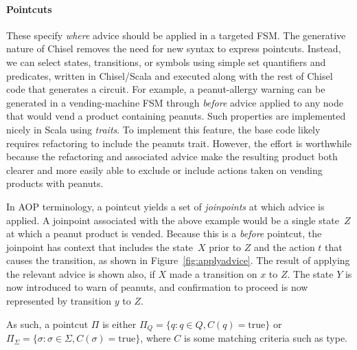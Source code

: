 \documentclass[sigplan,anonymous,review]{acmart}
\begin{document}
\paragraph{Pointcuts} These specify \emph{where} advice should be applied in a targeted FSM.   The generative nature of Chisel removes the need for new syntax to express pointcuts.  Instead, we can select states, transitions, or symbols using simple set quantifiers and predicates, written in Chisel/Scala and executed along with the rest of Chisel code that generates a circuit.  For example, a peanut-allergy warning can be generated in a vending-machine FSM through \emph{before} advice applied to any node that would vend a product containing peanuts.  Such properties are implemented nicely in Scala using \emph{traits}.  To implement this feature, the base code likely requires refactoring to include the peanuts trait.  However, the effort is worthwhile because the refactoring and associated advice make the resulting product both clearer and more easily able to exclude or include actions taken on vending products with peanuts.

In AOP terminology, a pointcut yields a set of \emph{joinpoints} at which advice is applied.  A joinpoint associated with the above example would be a single state~$Z$ at which a peanut product is vended.  Because this is a \emph{before} pointcut, the joinpoint has context that includes the state~$X$ prior to $Z$ and the action $t$ that causes the transition, as shown in Figure~\ref{fig:applyadvice}.  The result of applying the relevant advice is shown also, if $X$ made a transition on $x$ to $Z$.   The state $Y$ is now introduced to warn of peanuts, and confirmation to proceed is now represented by transition $y$ to $Z$.  

  As such, a pointcut $\Pi$ is either $\Pi_Q = \{q : q \in Q, C(q) = \mathrm{true}\}$ or $\Pi_\Sigma = \{\sigma : \sigma \in \Sigma, C(\sigma) = \mathrm{true}\}$, where $C$ is some matching criteria such as type.
\end{document}
